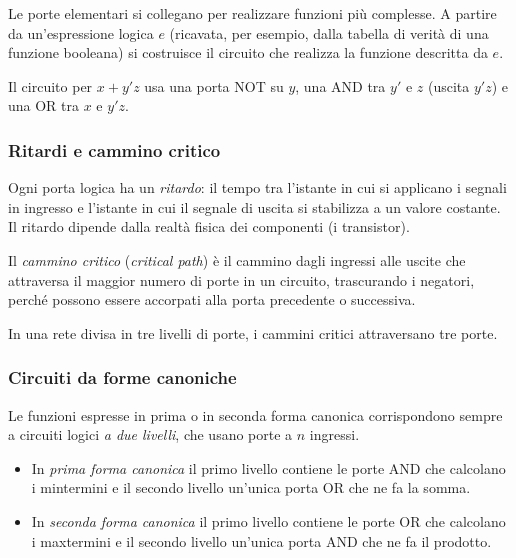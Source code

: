 \documentclass[11pt,a4paper]{article}
\begin{document}
Le porte elementari si collegano per realizzare funzioni più complesse. A partire da un'espressione logica $e$ (ricavata, per esempio, dalla tabella di verità di una funzione booleana) si costruisce il circuito che realizza la funzione descritta da $e$.

\begin{esempio}
Il circuito per $x + y'z$ usa una porta NOT su $y$, una AND tra $y'$ e $z$ (uscita $y'z$) e una OR tra $x$ e $y'z$.
\end{esempio}

\subsubsection{Ritardi e cammino critico}

Ogni porta logica ha un \emph{ritardo}: il tempo tra l'istante in cui si applicano i segnali in ingresso e l'istante in cui il segnale di uscita si stabilizza a un valore costante. Il ritardo dipende dalla realtà fisica dei componenti (i transistor).

\begin{definizione}
Il \emph{cammino critico} (\emph{critical path}) è il cammino dagli ingressi alle uscite che attraversa il maggior numero di porte in un circuito, trascurando i negatori, perché possono essere accorpati alla porta precedente o successiva.
\end{definizione}

\begin{esempio}
In una rete divisa in tre livelli di porte, i cammini critici attraversano tre porte.
\end{esempio}

\subsubsection{Circuiti da forme canoniche}

Le funzioni espresse in prima o in seconda forma canonica corrispondono sempre a circuiti logici \emph{a due livelli}, che usano porte a $n$ ingressi.
\begin{itemize}
    \item In \emph{prima forma canonica} il primo livello contiene le porte AND che calcolano i mintermini e il secondo livello un'unica porta OR che ne fa la somma.
    \item In \emph{seconda forma canonica} il primo livello contiene le porte OR che calcolano i maxtermini e il secondo livello un'unica porta AND che ne fa il prodotto.
\end{itemize}
\end{document}

